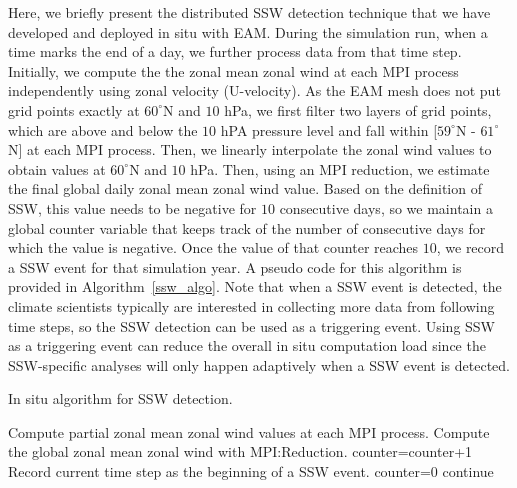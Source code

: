 \documentclass{juliacon}
\begin{document}
Here, we briefly present the distributed SSW detection technique that we have developed and deployed in situ with EAM. During the simulation run, when a time marks the end of a day, we further process data from that time step. Initially, we compute the the zonal mean zonal wind at each MPI process independently using zonal velocity (U-velocity). As the EAM mesh does not put grid points exactly at $60^{\circ}$N and $10$ hPa, we first filter two layers of grid points, which are above and below the $10$ hPA pressure level and fall within [$59^{\circ}$N - $61^{\circ}$N] at each MPI process. Then, we linearly interpolate the zonal wind values to obtain values at $60^{\circ}$N and $10$ hPa. Then, using an MPI reduction, we estimate the final global daily zonal mean zonal wind value. Based on the definition of SSW, this value needs to be negative for $10$ consecutive days, so we maintain a global counter variable that keeps track of the number of consecutive days for which the value is negative. Once the value of that counter reaches $10$, we record a SSW event for that simulation year. A pseudo code for this algorithm is provided in Algorithm~\ref{ssw_algo}. Note that when a SSW event is detected, the climate scientists typically are interested in collecting more data from following time steps, so the SSW detection can be used as a triggering event. Using SSW as a triggering event can reduce the overall in situ computation load since the SSW-specific analyses will only happen adaptively when a SSW event is detected.


\begin{algorithm}
\caption{In situ algorithm for SSW detection.}\label{ssw_algo}
\begin{algorithmic}[1]
\Statex
{}
    \State Compute partial zonal mean zonal wind values at each MPI process.
    \State Compute the global zonal mean zonal wind with MPI:Reduction.
    \State counter=counter+1
    \EndIf
    \State Record current time step as the beginning of a SSW event.
    \State counter=0
    \EndIf
  \Else
    \State continue
  \EndIf
\EndFor
\end{algorithmic}
\end{algorithm}
\end{document}
